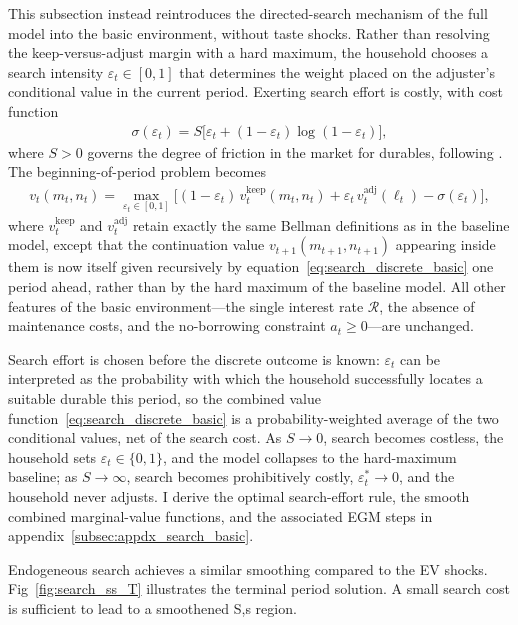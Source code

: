 This subsection instead reintroduces the directed-search mechanism of the full model into the basic environment, without taste shocks. Rather than resolving the keep-versus-adjust margin with a hard maximum, the household chooses a search intensity $\varepsilon_t \in [0,1]$ that determines the weight placed on the adjuster's conditional value in the current period. Exerting search effort is costly, with cost function
\begin{align}
	\sigma(\varepsilon_t) = S\big[\varepsilon_t + (1-\varepsilon_t)\log(1-\varepsilon_t)\big], \label{eq:search_cost_basic}
\end{align}
where $S>0$ governs the degree of friction in the market for durables, following \cite{Khan2019-ew}. The beginning-of-period problem becomes
\begin{align}
	v_t(m_t,n_t) = \max_{\varepsilon_t \in [0,1]} \Big[(1-\varepsilon_t)\, v_t^{\text{keep}}(m_t,n_t) + \varepsilon_t\, v_t^{\text{adj}}(\ell_t) - \sigma(\varepsilon_t)\Big], \label{eq:search_discrete_basic}
\end{align}
where $v_t^{\text{keep}}$ and $v_t^{\text{adj}}$ retain exactly the same Bellman definitions as in the baseline model, except that the continuation value $v_{t+1}(m_{t+1},n_{t+1})$ appearing inside them is now itself given recursively by equation~\eqref{eq:search_discrete_basic} one period ahead, rather than by the hard maximum of the baseline model. All other features of the basic environment---the single interest rate $\mathcal{R}$, the absence of maintenance costs, and the no-borrowing constraint $a_t \ge 0$---are unchanged.

Search effort is chosen before the discrete outcome is known: $\varepsilon_t$ can be interpreted as the probability with which the household successfully locates a suitable durable this period, so the combined value function~\eqref{eq:search_discrete_basic} is a probability-weighted average of the two conditional values, net of the search cost. As $S \to 0$, search becomes costless, the household sets $\varepsilon_t \in \{0,1\}$, and the model collapses to the hard-maximum baseline; as $S \to \infty$, search becomes prohibitively costly, $\varepsilon_t^\ast \to 0$, and the household never adjusts. I derive the optimal search-effort rule, the smooth combined marginal-value functions, and the associated EGM steps in appendix~\ref{subsec:appdx_search_basic}.

Endogeneous search achieves a similar smoothing compared to the EV shocks. Fig~\ref{fig:search_ss_T} illustrates the terminal period solution. A small search cost is sufficient to lead to a smoothened S,s region.

